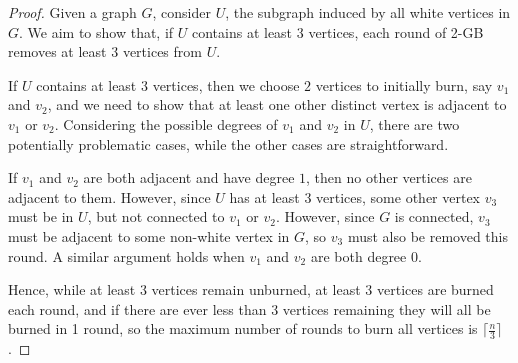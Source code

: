 \documentclass{mpaper}
\begin{document}
\begin{proof}
  Given a graph $G$, consider $U$, the subgraph induced by all white vertices in $G$. We aim to show that, if $U$ contains at least $3$ vertices, each round of 2-GB removes at least $3$ vertices from $U$.

  If $U$ contains at least $3$ vertices, then we choose $2$ vertices to initially burn, say $v_1$ and $v_2$, and we need to show that at least one other distinct vertex is adjacent to $v_1$ or $v_2$. Considering the possible degrees of $v_1$ and $v_2$ in $U$, there are two potentially problematic cases, while the other cases are straightforward.

  If $v_1$ and $v_2$ are both adjacent and have degree $1$, then no other vertices are adjacent to them. However, since $U$ has at least $3$ vertices, some other vertex $v_3$ must be in $U$, but not connected to $v_1$ or $v_2$. However, since $G$ is connected, $v_3$ must be adjacent to some non-white vertex in $G$, so $v_3$ must also be removed this round. A similar argument holds when $v_1$ and $v_2$ are both degree $0$.
  
  




  Hence, while at least $3$ vertices remain unburned, at least $3$ vertices are burned each round, and if there are ever less than $3$ vertices remaining they will all be burned in 1 round, so the maximum number of rounds to burn all vertices is $\lceil \frac{n}{3} \rceil$.
  
\end{proof}
\end{document}
